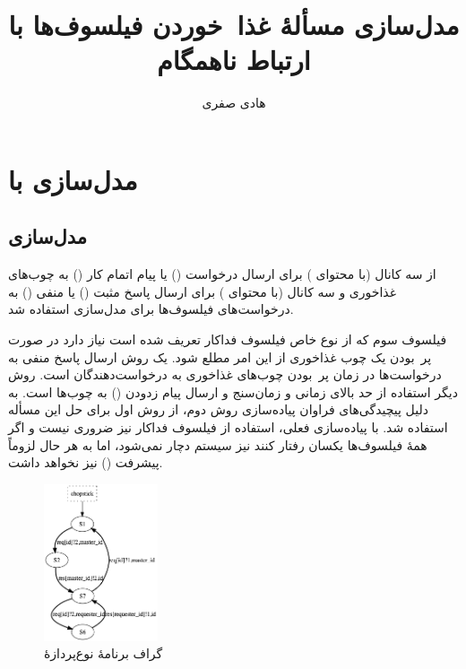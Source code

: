 \documentclass[12pt, logo=tehranReport/logo]{tehranReport}
\title{مدل‌سازی مسألهٔ غذا~خوردن فیلسوف‌ها با ارتباط ناهمگام}
\author{هادی صفری}
\begin{document}
\maketitlepage

\tableofcontents
\newpage

\chapter{مدل‌سازی با }

\section{مدل‌سازی}

از سه کانال  (با محتوای )
برای ارسال درخواست () یا پیام اتمام کار () به چوب‌های غذاخوری
و سه کانال  (با محتوای )
برای ارسال پاسخ مثبت () یا منفی () به درخواست‌های فیلسوف‌ها
برای مدل‌سازی
استفاده شد.

فیلسوف سوم که از نوع خاص فیلسوف فداکار تعریف شده است نیاز دارد در صورت پر~بودن یک چوب غذاخوری از این امر مطلع شود.
یک روش ارسال پاسخ منفی به درخواست‌ها در زمان پر~بودن چوب‌های غذاخوری به درخواست‌دهندگان است.
روش دیگر استفاده از حد بالای زمانی و زمان‌سنج و ارسال پیام زدودن () به چوب‌ها است.
به دلیل پیچیدگی‌های فراوان پیاده‌سازی روش دوم، از روش اول برای حل این مسأله استفاده شد.
با پیاده‌سازی فعلی، استفاده از فیلسوف فداکار نیز ضروری نیست و اگر همهٔ فیلسوف‌ها یکسان رفتار کنند نیز
سیستم دچار  نمی‌شود،
اما به هر حال لزوماً پیشرفت () نیز نخواهد داشت.

\begin{figure}[H]
\centering
\includegraphics[width=0.3\textwidth]{chopstick}
\caption{گراف برنامهٔ نوع‌پردازهٔ }
\end{figure}
\end{document}
